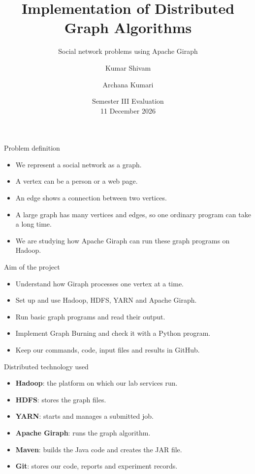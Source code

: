 \documentclass[aspectratio=169]{beamer}
\title{Implementation of Distributed Graph Algorithms}
\subtitle{Social network problems using Apache Giraph}
\author{Kumar Shivam \and Archana Kumari}
\institute{School of Computer and Information Sciences\\University of Hyderabad}
\date{Semester III Evaluation\\11 December 2026}
\begin{document}
\begin{frame}
  \titlepage
\end{frame}

\begin{frame}{Problem definition}
\begin{itemize}
  \item We represent a social network as a graph.
  \item A vertex can be a person or a web page.
  \item An edge shows a connection between two vertices.
  \item A large graph has many vertices and edges, so one ordinary program can take a long time.
  \item We are studying how Apache Giraph can run these graph programs on Hadoop.
\end{itemize}
\end{frame}

\begin{frame}{Aim of the project}
\begin{itemize}
  \item Understand how Giraph processes one vertex at a time.
  \item Set up and use Hadoop, HDFS, YARN and Apache Giraph.
  \item Run basic graph programs and read their output.
  \item Implement Graph Burning and check it with a Python program.
  \item Keep our commands, code, input files and results in GitHub.
\end{itemize}
\end{frame}

\begin{frame}{Distributed technology used}
\begin{itemize}
  \item \textbf{Hadoop}: the platform on which our lab services run.
  \item \textbf{HDFS}: stores the graph files.
  \item \textbf{YARN}: starts and manages a submitted job.
  \item \textbf{Apache Giraph}: runs the graph algorithm.
  \item \textbf{Maven}: builds the Java code and creates the JAR file.
  \item \textbf{Git}: stores our code, reports and experiment records.
\end{itemize}
\end{frame}
\end{document}
